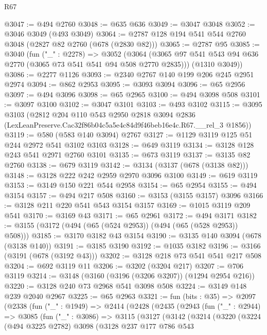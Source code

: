 \begin{lexlean}{R67}
\begin{coremodule}
@3047 := @494 @2760
@3048 := @635 @636
@3049 := @3047 @3048
@3052 := @3046 @3049 (@493 @3049)
@3064 := @2787 @128 @194 @541 @544 @2760 @3048 (@2827 @82 @2760 (@678 (@2830 @82)))
@3065 := @2787 @95
@3085 := @3040
    (fun ("_" : @2278) =>
    @3052
      (@3064 (@3065 @97 @541 @543 @94 @636 @2770 (@3065 @73 @541 @541 @94 @508 @2770 @2835)))
      (@1310 @3049))
@3086 := @2277 @1126
@3093 := @2340 @2767 @140 @199 @206 @245 @2951 @2974
@3094 := @862 @2953
@3095 := @3093 @3094
@3096 := @65 @2956
@3097 := @494 @3096
@3098 := @65 @2965
@3100 := @494 @3098 @508
@3101 := @3097 @3100
@3102 := @3047 @3101
@3103 := @493 @3102
@3115 := @3095
    @3103
    (@2812
      @204
      @110
      @543
      @2950
      @2818
      @3094
      @2836
      (LexLeanPreserve.Cac32f86b04c5a5e4c84d9f46beb16e4c.R67.__rel_3 @1856))
@3119 := @580 (@583 @140 @3094) @2767
@3127 := @1129 @3119 @125 @51 @244 @2972 @541 @3102 @3103
@3128 := @649 @3119
@3134 := @3128 @128 @243 @541 @2971 @2760 @3101
@3135 := @673 @3119
@3137 := @3135 @82 @2760
@3138 := @679 @3119
@3142 := @3134 (@3137 (@678 (@3138 @82)))
@3148 := @3128 @222 @242 @2959 @2970 @3096 @3100
@3149 := @619 @3119
@3153 := @3149 @150 @221 @544 @2958
@3154 := @65 @2954
@3155 := @494 @3154
@3157 := @494 @217 @508
@3160 := @3153 (@3155 @3157) @3096
@3166 := @3128 @211 @220 @541 @543 @3154 @3157
@3169 := @1015 @3119 @209 @541
@3170 := @3169 @43
@3171 := @65 @2961
@3172 := @494 @3171
@3182 := @3155 (@3172 (@494 (@65 (@524 @2953)) (@494 (@65 (@528 @2953)) @508)))
@3185 := @3170 @3182 @43 @3154
@3190 := @3135 @140 @3094 (@678 (@3138 @140))
@3191 := @3185 @3190
@3192 := @1035 @3182
@3196 := @3166 (@3191 (@678 (@3192 @43)))
@3202 := @3128 @218 @73 @541 @541 @217 @508
@3204 := @692 @3119 @11
@3206 := @3202 (@3204 @217)
@3207 := @706 @3119
@3214 := @3148 (@3160 (@3196 (@3206 @3207)) (@1294 @2954 @216))
@3220 := @3128 @240 @73 @2968 @541 @3098 @508
@3224 := @3149 @148 @239 @2040 @2967
@3225 := @65 @2963
@3321 := fun (bits : @35) =>
  @2097
    (@2338
      (fun ("_" : @1949) =>
      @2414
        (@2428
          (@2435
            (@2943
              (fun ("_" : @2944) =>
              @3085
                (fun ("_" : @3086) =>
                @3115
                  (@3127
                    (@3142
                      (@3214
                        (@3220
                          (@3224
                            (@494 @3225 @2782)
                            @3098
                            (@3128
                              @237
                              @177
                              @786
                              @543

\end{coremodule}
\end{lexlean}
